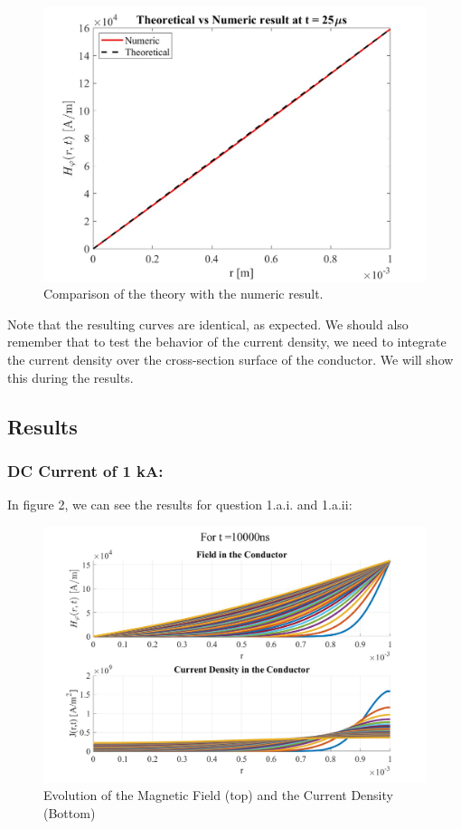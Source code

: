 \documentclass{article}
\begin{document}
\begin{figure}[ht]
\centering
\includegraphics[scale=0.25]{test_plot_figures}
\caption{Comparison of the theory with the numeric result.}
\end{figure}

Note that the resulting curves are identical, as expected. We should also remember that to test the behavior of the current density, we need to integrate the current density over the cross-section surface of the conductor. We will show this during the results.

\subsection{Results}

\subsubsection{DC Current of 1 kA:}

In figure 2, we can see the results for question 1.a.i. and 1.a.ii:
\begin{figure}[ht]
\centering
\includegraphics[scale=0.24]{DC_behavior}
\caption{Evolution of the Magnetic Field (top) and the Current Density (Bottom)}
\end{figure}
\end{document}
